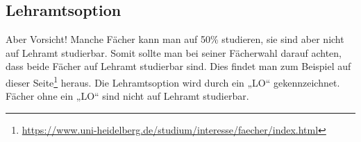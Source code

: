 %
%
%
%
%
%

\subsection{Lehramtsoption}
Aber Vorsicht! Manche Fächer kann man auf 50\% studieren, sie sind aber nicht auf Lehramt studierbar. Somit sollte man bei seiner Fächerwahl darauf achten, dass beide Fächer auf Lehramt studierbar sind. Dies findet man zum Beispiel auf dieser Seite\footnote{\url{https://www.uni-heidelberg.de/studium/interesse/faecher/index.html}} heraus. Die Lehramts\-option wird durch ein „LO“ gekennzeichnet. Fächer ohne ein „LO“ sind nicht auf Lehramt studierbar.

